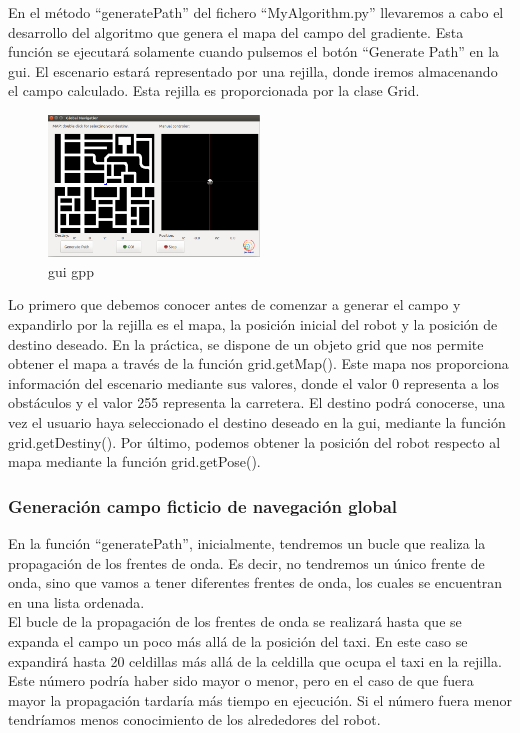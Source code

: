 En el método ``generatePath'' del fichero ``MyAlgorithm.py'' llevaremos a cabo el desarrollo del algoritmo que genera el mapa del campo del gradiente. Esta función se ejecutará solamente cuando pulsemos el botón ``Generate Path'' en la \acrshort{gui}. El escenario estará representado por una rejilla, donde iremos almacenando el campo calculado. Esta rejilla es proporcionada por la clase Grid.
\begin{figure}[H]
  \begin{center}
    \includegraphics[width=0.5\textwidth]{figures/GPP/GUI.png}
		\caption{\acrshort{gui} \acrshort{gpp}}
		\label{fig.gui_gpp}
		\end{center}
\end{figure}

Lo primero que debemos conocer antes de comenzar a generar el campo y expandirlo por la rejilla es el mapa, la posición inicial del robot y la posición de destino deseado. En la práctica, se dispone de un objeto grid que nos permite obtener el mapa a través de la función grid.getMap(). Este mapa nos proporciona información del escenario mediante sus valores, donde el valor 0 representa a los obstáculos y el valor 255 representa la carretera. El destino podrá conocerse, una vez el usuario haya seleccionado el destino deseado en la \acrshort{gui}, mediante la función grid.getDestiny(). Por último, podemos obtener la posición del robot respecto al mapa mediante la función grid.getPose().

\subsubsection{Generación campo ficticio de navegación global}
En la función ``generatePath'', inicialmente, tendremos un bucle que realiza la propagación de los frentes de onda. Es decir, no tendremos un único frente de onda, sino que vamos a tener diferentes frentes de onda, los cuales se encuentran en una lista ordenada. \\

El bucle de la propagación de los frentes de onda se realizará hasta que se expanda el campo un poco más allá de la posición del taxi. En este caso se expandirá hasta 20 celdillas más allá de la celdilla que ocupa el taxi en la rejilla. Este número podría haber sido mayor o menor, pero en el caso de que fuera mayor la propagación tardaría más tiempo en ejecución. Si el número fuera menor tendríamos menos conocimiento de los alrededores del robot.\\


